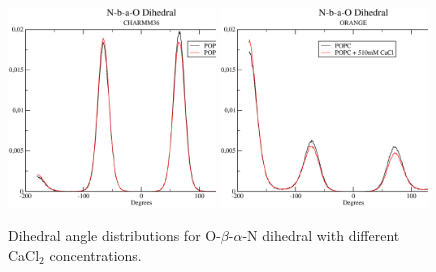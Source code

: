 \documentclass[pre,aps,floatfix,authordate1-4,twocolumn]{revtex4-1}
\begin{document}
\begin{figure}[]
  \centering
  \includegraphics[width=0.49\textwidth]{../Fig/O-b-a-NdihWITHcaCHARMM36.eps} %
  \includegraphics[width=0.49\textwidth]{../Fig/O-b-a-NdihWITHcaORANGE.eps} %
  \caption{\label{ObaNdihs}
      Dihedral angle distributions for O-$\beta$-$\alpha$-N dihedral with different CaCl$_2$ concentrations.}
\end{figure}

\end{document}
